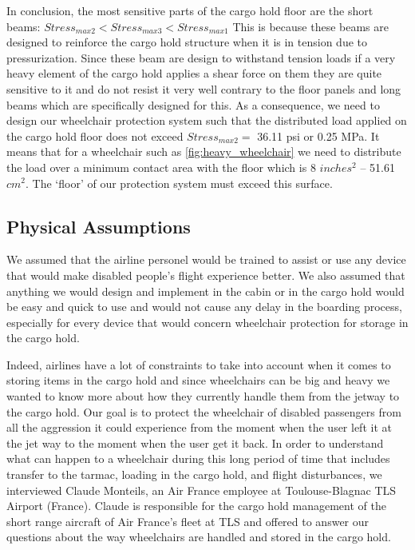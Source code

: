 In conclusion, the most sensitive parts of the cargo hold floor are the short beams:
$Stress_{max 2} < Stress_{max 3} < Stress_{max 1}$
 This is because these beams are designed to reinforce the cargo hold structure when it is in tension due to pressurization. Since these beam are design to withstand tension loads if a very heavy element of the cargo hold applies a shear force on them they are quite sensitive to it and do not resist it very well contrary to the floor panels and long beams which are specifically designed for this.
As a consequence, we need to design our wheelchair protection system such that the distributed load applied on the cargo hold floor does not exceed $ Stress_{max 2} =$ 36.11 psi or 0.25 MPa. It means that for a wheelchair such as \ref{fig:heavy_wheelchair} we need to distribute the load over a minimum contact area with the floor which is 8 $inches^2$ – 51.61 $cm^2$. The ‘floor’ of our protection system must exceed this surface.

\subsection{Physical Assumptions}

We assumed that the airline personel would be trained to assist or use any device that would make disabled people's flight experience better. We also assumed that anything we would design and implement in the cabin or in the cargo hold would be easy and quick to use and would not cause any delay in the boarding process, especially for every device that would concern wheelchair protection for storage in the cargo hold.

Indeed, airlines have a lot of constraints to take into account when it comes to storing items in the cargo hold and since wheelchairs can be big and heavy we wanted to know more about how they currently handle them from the jetway to the cargo hold. Our goal is to protect the wheelchair of disabled passengers from all the aggression it could experience from the moment when the user left it at the jet way to the moment when the user get it back. In order to understand what can happen to a wheelchair during this long period of time that includes transfer to the tarmac, loading in the cargo hold, and flight disturbances, we interviewed Claude Monteils, an Air France employee at Toulouse-Blagnac TLS Airport (France). Claude is responsible for the cargo hold management of the short range aircraft of Air France’s fleet at TLS and offered to answer our questions about the way wheelchairs are handled and stored in the cargo hold.

